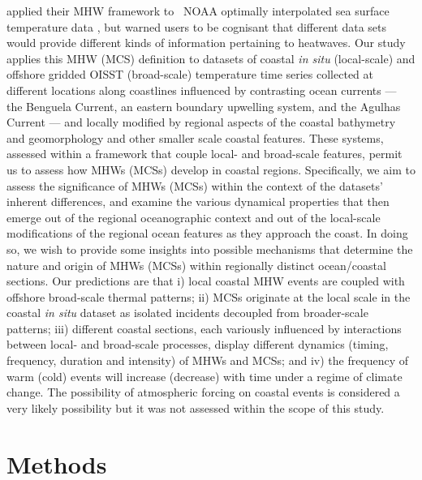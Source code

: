 \documentclass[a4paper,10pt,review]{elsarticle}
\begin{document}
\citet{Hobday2016} applied their MHW framework to \degree~NOAA optimally interpolated sea surface temperature data \citep[hereafter referred to as OISST;][]{Reynolds2007}, but warned users to be cognisant that different data sets would provide different kinds of information pertaining to heatwaves. Our study applies this MHW (MCS) definition to datasets of coastal \emph{in situ} (local-scale) and offshore gridded OISST (broad-scale) temperature time series collected at different locations along coastlines influenced by contrasting ocean currents --- the Benguela Current, an eastern boundary upwelling system, and the Agulhas Current --- and locally modified by regional aspects of the coastal bathymetry and geomorphology and other smaller scale coastal features. These systems, assessed within a framework that couple local- and broad-scale features, permit us to assess how MHWs (MCSs) develop in coastal regions. Specifically, we aim to assess the significance of MHWs (MCSs) within the context of the datasets’ inherent differences, and examine the various dynamical properties that then emerge out of the regional oceanographic context and out of the local-scale modifications of the regional ocean features as they approach the coast. In doing so, we wish to provide some insights into possible mechanisms that determine the nature and origin of MHWs (MCSs) within regionally distinct ocean/coastal sections. Our predictions are that i) local coastal MHW events are coupled with offshore broad-scale thermal patterns; ii) MCSs originate at the local scale in the coastal \emph{in situ} dataset as isolated incidents decoupled from broader-scale patterns; iii) different coastal sections, each variously influenced by interactions between local- and broad-scale processes, display different dynamics (timing, frequency, duration and intensity) of MHWs and MCSs; and iv) the frequency of warm (cold) events will increase (decrease) with time under a regime of climate change. The possibility of atmospheric forcing on coastal events is considered a very likely possibility but it was not assessed within the scope of this study.

\section{Methods}
\end{document}

